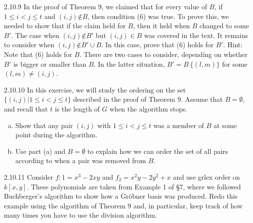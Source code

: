 \documentclass[twoside]{article}
\begin{document}
\begin{ejercicio}{2.10.9}
In the proof of Theorem 9, we claimed that for every value of $B$, if $1 ≤ i < j ≤ t$ and
$(i, j) \not∈
B$, then condition (6) was true. To prove this, we needed to show that if the
claim held for $B$, then it held when $B$ changed to some $B'$. The case when $(i, j) \not∈
B'$ but
$(i, j) ∈ B$ was covered in the text. It remains to consider when $(i, j) \not∈B' ∪ B$. In this
case, prove that (6) holds for $B'$. Hint: Note that (6) holds for $B$. There are two cases
to consider, depending on whether $B'$ is bigger or smaller than $B$. In the latter situation,
$B'
= B \ \{(l,m)\}$ for some $(l,m) \neq (i, j)$.
\end{ejercicio}
\begin{solucion}

\end{solucion}

\newpage

\begin{ejercicio}{2.10.10}
In this exercise, we will study the ordering on the set $\{(i, j) | 1 ≤ i < j ≤ t\}$ described
in the proof of Theorem 9. Assume that $B = ∅$, and recall that $t$ is the length of $G$ when
the algorithm stops.
\begin{enumerate}[a.]
\item Show that any pair $(i, j)$ with $1 ≤ i < j ≤ t$ was a member of $B$ at some point during
the algorithm.
\item Use part (a) and $B = ∅$ to explain how we can order the set of all pairs according to
when a pair was removed from $B$.
\end{enumerate}
\end{ejercicio}
\begin{solucion}
\end{solucion}

\newpage

\begin{ejercicio}{2.10.11}
Consider $f:1 = x^3−2xy$ and $f_2 = x^2y−2y^2+x$ and use grlex order on $k[x, y]$. These polynomials
are taken from Example 1 of §7, where we followed Buchberger’s algorithm
to show how a Gröbner basis was produced. Redo this example using the algorithm of
Theorem 9 and, in particular, keep track of how many times you have to use the division
algorithm.
\end{ejercicio}
\begin{solucion}


\end{solucion}
\newpage
\end{document}
